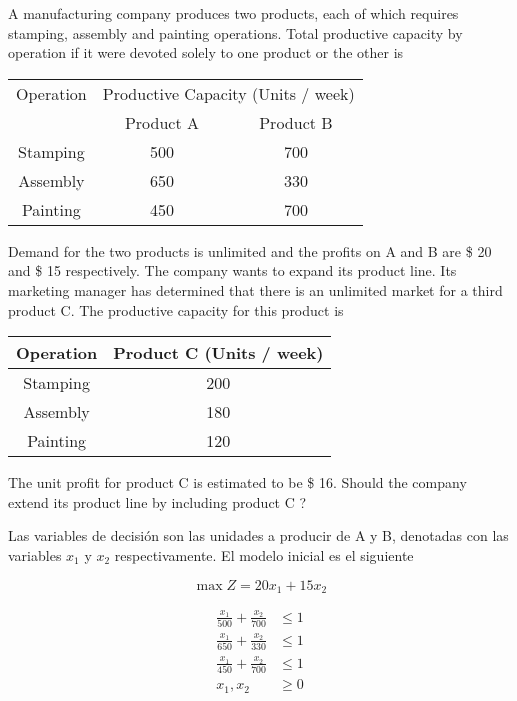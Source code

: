 \documentclass[../main.tex]{subfiles}
\begin{document}
\printanswers

\begin{questions}
\question %

A manufacturing company produces two products, each of which requires stamping, assembly and painting operations. Total productive capacity by operation if it were devoted solely to one product or the other is

{\centering
  \begin{tabular}{ccc}
    \toprule
    Operation& \multicolumn{2}{c}{Productive Capacity (Units / week)} \\
    \cmidrule{2-3}
             &Product A& Product B \\
    \midrule
    Stamping & 500 & 700\\
    Assembly & 650 & 330\\
    Painting & 450 & 700\\
       \bottomrule
  \end{tabular}
  \par}

Demand for the two products is unlimited and the profits on A and B are \$ 20 and \$ 15 respectively. The company wants to expand its product line. Its marketing manager has determined that there is an unlimited market for a third product C. The productive capacity for
this product is

{\centering
  \begin{tabular}{cc}
    \toprule
    Operation& Product C (Units / week) \\
    \midrule
    Stamping & 200 \\
    Assembly & 180 \\
    Painting & 120 \\
       \bottomrule
  \end{tabular}
  \par}

The unit profit for product C is estimated to be \$ 16. Should the company extend its product line by including product C ?


\begin{solution}{}
  Las variables de decisión son las unidades a producir de A y B, denotadas con las variables $x_1$ y $x_2$ respectivamente.  El modelo inicial es el siguiente
  
  \[\max Z = 20x_1 + 15x_2  \]

  \begin{align*}
    \frac{x_1}{500} + \frac{x_2}{700}   &\leq 1\\[3mm]
\frac{x_1}{650} + \frac{x_2}{330}  &\leq 1\\[3mm]
    \frac{x_1}{450} + \frac{x_2}{700}   &\leq 1\\[3mm]
    x_1, x_2 &\geq 0
  \end{align*}
  


\end{solution}
\end{questions}
\end{document}

